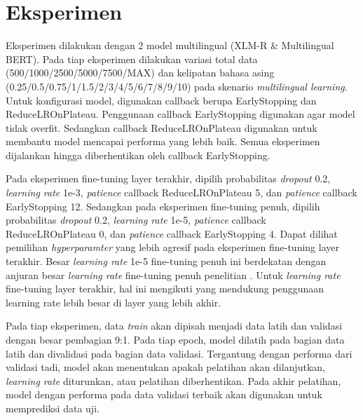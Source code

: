 \section{Eksperimen}
Eksperimen dilakukan dengan 2 model multilingual (XLM-R \& Multilingual BERT). Pada tiap eksperimen dilakukan variasi total data (500/1000/2500/5000/7500/MAX) dan kelipatan bahasa asing (0.25/0.5/0.75/1/1.5/2/3/4/5/6/7/8/9/10) pada skenario \textit{multilingual learning}. Untuk konfigurasi model, digunakan callback berupa EarlyStopping dan ReduceLROnPlateau. Penggunaan callback EarlyStopping digunakan agar model tidak overfit. Sedangkan callback ReduceLROnPlateau digunakan untuk membantu model mencapai performa yang lebih baik. Semua eksperimen dijalankan hingga diberhentikan oleh callback EarlyStopping.

Pada eksperimen fine-tuning layer terakhir, dipilih probabilitas \textit{dropout} 0.2, \textit{learning rate} 1e-3, \textit{patience} callback ReduceLROnPlateau 5, dan \textit{patience} callback EarlyStopping 12. Sedangkan pada eksperimen fine-tuning penuh, dipilih probabilitas \textit{dropout} 0.2, \textit{learning rate} 1e-5, \textit{patience} callback ReduceLROnPlateau 0, dan \textit{patience} callback EarlyStopping 4. Dapat dilihat pemilihan \textit{hyperparamter} yang lebih agresif pada eksperimen fine-tuning layer terakhir. Besar \textit{learning rate} 1e-5 fine-tuning penuh ini berdekatan dengan anjuran besar \textit{learning rate} fine-tuning penuh penelitian \parencite{Devlin_Chang_Lee_Toutanova_2019}. Untuk \textit{learning rate} fine-tuning layer terakhir, hal ini mengikuti \parencite{Peters_Ruder_Smith_2019} yang mendukung penggunaan learning rate lebih besar di layer yang lebih akhir. 

Pada tiap eksperimen, data \textit{train} akan dipisah menjadi data latih dan validasi dengan besar pembagian 9:1. Pada tiap epoch, model dilatih pada bagian data latih dan divalidasi pada bagian data validasi. Tergantung dengan performa dari validasi tadi, model akan menentukan apakah pelatihan akan dilanjutkan, \textit{learning rate} diturunkan, atau pelatihan diberhentikan. Pada akhir pelatihan, model dengan performa pada data validasi terbaik akan digunakan untuk memprediksi data uji.


